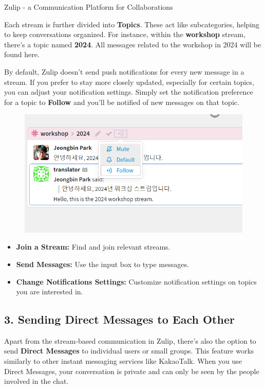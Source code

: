\begin{coverpage}{Zulip - a Communication Platform for Collaborations}
{Each stream is further divided into \textbf{Topics}. These act like subcategories, helping to keep conversations organized. For instance, within the \textbf{workshop} stream, there's a topic named \textbf{2024}. All messages related to the workshop in 2024 will be found here.

By default, Zulip doesn't send push notifications for every new message in a stream. If you prefer to stay more closely updated, especially for certain topics, you can adjust your notification settings. Simply set the notification preference for a topic to \textbf{Follow} and you'll be notified of new messages on that topic.

\begin{figure}[h]
\includegraphics[width=\textwidth]{images/zulip-follow.png}
\centering
\end{figure}

\begin{itemize}[leftmargin=0.5cm, rightmargin=0.5cm]
\item \textbf{Join a Stream:} Find and join relevant streams.
\item \textbf{Send Messages:} Use the input box to type messages.
\item \textbf{Change Notifications Settings:} Customize notification settings on topics you are interested in.
\end{itemize}
\subsection*{3. Sending Direct Messages to Each Other}
Apart from the stream-based communication in Zulip, there's also the option to send \textbf{Direct Messages} to individual users or small groups. This feature works similarly to other instant messaging services like KakaoTalk. When you use Direct Messages, your conversation is private and can only be seen by the people involved in the chat.

}
\end{coverpage}
